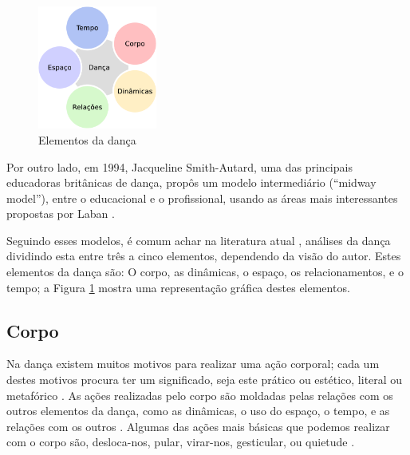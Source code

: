 \begin{figure}
\centering
\vspace{-15pt}
\includegraphics[width=0.35\textwidth]{chapters/cap-dance-elements/DanceElements.eps}
\caption{Elementos da dança}
\label{fig:elementosdanca1}
\vspace{-10pt}
\end{figure}
Por outro lado, em 1994, Jacqueline Smith-Autard, uma das principais educadoras britânicas de dança, 
propôs um modelo intermediário (``midway model''), entre o educacional e o profissional, 
usando as áreas mais interessantes propostas por Laban \cite[pp. 12]{paine2014complete}.

Seguindo esses modelos, é comum achar na literatura atual 
\cite[pp. 4]{carline2011lesson}       %
\cite[pp. 13,27]{paine2014complete}   %
\cite[pp. 69]{schrader2005sense}      %
\cite[pp. 131]{mccutchen2006teaching},%
 análises  da dança dividindo esta entre três a cinco elementos,
dependendo da visão do autor.
Estes elementos da dança são: O corpo, as dinâmicas, o espaço, os relacionamentos, e o tempo;
a Figura \ref{fig:elementosdanca1} mostra uma representação gráfica destes elementos.



\subsection{Corpo}
Na dança existem muitos motivos para realizar uma ação corporal;
cada um destes motivos procura ter um significado, seja este prático ou estético, literal ou metafórico \cite[pp. 5]{carline2011lesson}.
As ações realizadas pelo corpo são moldadas pelas relações com os outros elementos da dança,
como as dinâmicas, o uso do espaço, o tempo, e as relações com os outros \cite[pp. 5]{carline2011lesson}.
Algumas das ações mais básicas que podemos realizar com o corpo são,
desloca-nos, pular, virar-nos, gesticular, ou quietude \cite[pp. 27]{paine2014complete}.

